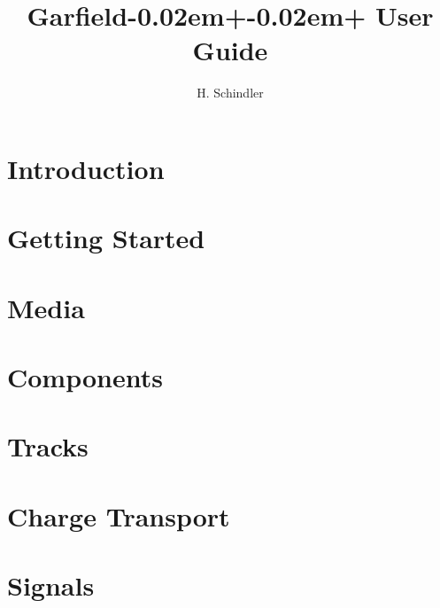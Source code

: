 \documentclass[11pt, a4paper, twoside]{scrreprt}
\title{Garfield\kern-0.02em+\kern-0.02em+ User Guide}
\author{H. Schindler}
\begin{document}

\cleardoublepage
\tableofcontents
\cleardoublepage

\chapter{Introduction}
  

\chapter{Getting Started}\label{Chap:Installation}
  
\lstset{language=C++}
  

\chapter{Media}\label{Chap:Media}
  

\chapter{Components}\label{Chap:Components}
  

\chapter{Tracks}\label{Chap:Tracks}
  

\chapter{Charge Transport}\label{Chap:Transport}
  

\chapter{Signals}\label{Chap:Signals}
  



\cleardoublepage
{}


\end{document}

